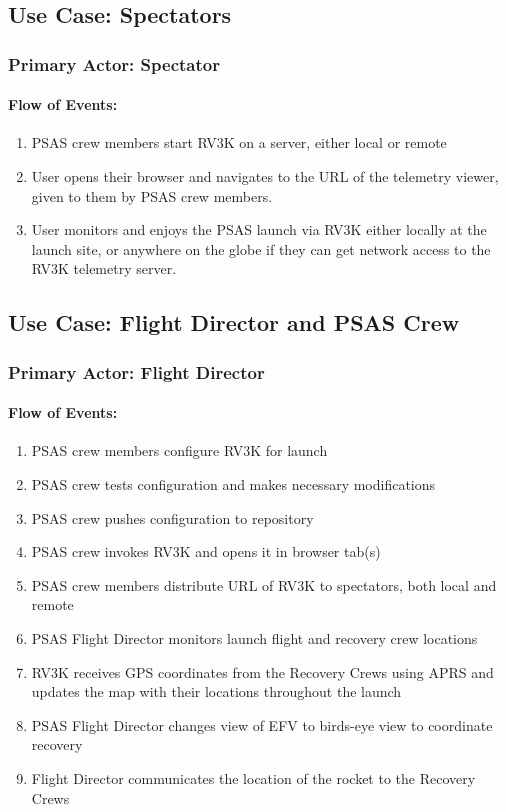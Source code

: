 \subsection{Use Case: Spectators}
  \subsubsection{Primary Actor: Spectator}
    \paragraph{Flow of Events:}
      \begin{enumerate}
        \item PSAS crew members start RV3K on a server, either local or remote
        \item User opens their browser and navigates to the URL of the telemetry viewer, given to them by PSAS crew members.
        \item User monitors and enjoys the PSAS launch via RV3K either locally at the launch site, or anywhere on the globe if they can get network access to the RV3K telemetry server. 
      \end{enumerate}
\subsection{Use Case: Flight Director and PSAS Crew}
  \subsubsection{Primary Actor: Flight Director}
    \paragraph{Flow of Events:}
      \begin{enumerate}
         \item PSAS crew members configure RV3K for launch
         \item PSAS crew tests configuration and makes necessary modifications
         \item PSAS crew pushes configuration to repository
         \item PSAS crew invokes RV3K and opens it in browser tab(s)
         \item PSAS crew members distribute URL of RV3K to spectators, both local and remote
         \item PSAS Flight Director monitors launch flight and recovery crew locations
         \item RV3K receives GPS coordinates from the Recovery Crews using APRS
              and updates the map with their locations throughout the launch
         \item PSAS Flight Director changes view of EFV to birds-eye view to coordinate recovery
         \item Flight Director communicates the location of the rocket to the
              Recovery Crews
      \end{enumerate}
